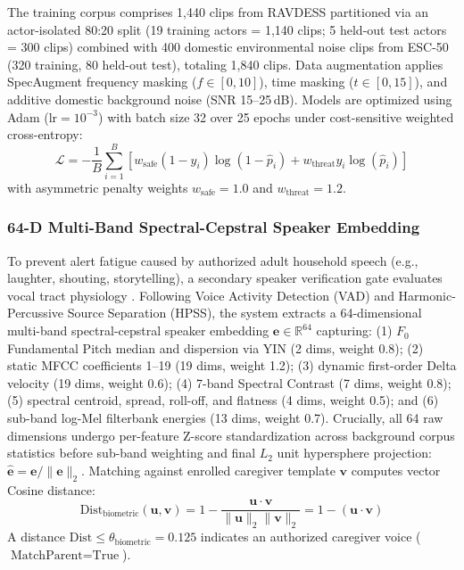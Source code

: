 \documentclass[conference]{IEEEtran}
\begin{document}
The training corpus comprises 1,440 clips from RAVDESS \cite{b20} partitioned via an actor-isolated 80:20 split (19 training actors = 1,140 clips; 5 held-out test actors = 300 clips) combined with 400 domestic environmental noise clips from ESC-50 \cite{b22} (320 training, 80 held-out test), totaling 1,840 clips. Data augmentation applies SpecAugment frequency masking ($f \in [0, 10]$), time masking ($t \in [0, 15]$), and additive domestic background noise (SNR 15–25\,dB). Models are optimized using Adam ($\text{lr} = 10^{-3}$) with batch size 32 over 25 epochs under cost-sensitive weighted cross-entropy:
\begin{equation}
\mathcal{L} = -\frac{1}{B} \sum_{i=1}^{B} [ w_{\text{safe}}(1 - y_i) \log(1 - \hat{p}_i) + w_{\text{threat}} y_i \log(\hat{p}_i) ] \label{eq2}
\end{equation}
with asymmetric penalty weights $w_{\text{safe}} = 1.0$ and $w_{\text{threat}} = 1.2$.

\subsubsection{64-D Multi-Band Spectral-Cepstral Speaker Embedding}
To prevent alert fatigue caused by authorized adult household speech (e.g., laughter, shouting, storytelling), a secondary speaker verification gate evaluates vocal tract physiology \cite{b9}. Following Voice Activity Detection (VAD) and Harmonic-Percussive Source Separation (HPSS), the system extracts a 64-dimensional multi-band spectral-cepstral speaker embedding $\mathbf{e} \in \mathbb{R}^{64}$ capturing: (1) $F_0$ Fundamental Pitch median and dispersion via YIN (2 dims, weight 0.8); (2) static MFCC coefficients 1--19 (19 dims, weight 1.2); (3) dynamic first-order Delta velocity (19 dims, weight 0.6); (4) 7-band Spectral Contrast (7 dims, weight 0.8); (5) spectral centroid, spread, roll-off, and flatness (4 dims, weight 0.5); and (6) sub-band log-Mel filterbank energies (13 dims, weight 0.7). Crucially, all 64 raw dimensions undergo per-feature Z-score standardization across background corpus statistics before sub-band weighting and final $L_2$ unit hypersphere projection: $\hat{\mathbf{e}} = \mathbf{e}/\|\mathbf{e}\|_2$. Matching against enrolled caregiver template $\mathbf{v}$ computes vector Cosine distance:
\begin{equation}
\text{Dist}_{\text{biometric}}(\mathbf{u}, \mathbf{v}) = 1 - \frac{\mathbf{u} \cdot \mathbf{v}}{\|\mathbf{u}\|_2 \|\mathbf{v}\|_2} = 1 - (\mathbf{u} \cdot \mathbf{v}) \label{eq3}
\end{equation}
A distance $\text{Dist} \le \theta_{\text{biometric}} = 0.125$ indicates an authorized caregiver voice ($\text{MatchParent} = \text{True}$).
\end{document}
